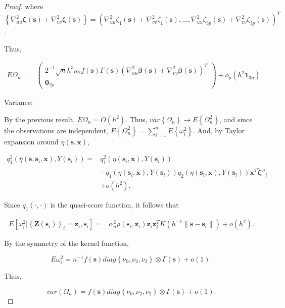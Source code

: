 \documentclass[english]{article}\usepackage[]{graphicx}\usepackage[]{color}
\theoremstyle{plain}
\theoremstyle{plain}
\begin{document}
\begin{proof}
where $\left\{ \nabla_{uu}^{2}\bm{\zeta}\left(\bm{s}\right)+\nabla_{vv}^{2}\bm{\zeta}\left(\bm{s}\right)\right\} =\left(\nabla_{uu}^{2}\zeta_{1}\left(\bm{s}\right)+\nabla_{vv}^{2}\zeta_{1}\left(\bm{s}\right),\dots,\nabla_{uu}^{2}\zeta_{3p}\left(\bm{s}\right)+\nabla_{vv}^{2}\zeta_{3p}\left(\bm{s}\right)\right)^{T}$.

Thus,

\begin{align*}
E\Omega_{n}= & \left(\begin{array}{c}
2^{-1}\sqrt{n}h^{3}\kappa_{2}f\left(\bm{s}\right)\Gamma\left(\bm{s}\right)\left(\nabla_{uu}^{2}\bm{\beta}\left(\bm{s}\right)+\nabla_{vv}^{2}\bm{\beta}\left(\bm{s}\right)\right)^{T}\\
\bm{0}_{2p}
\end{array}\right)+o_{p}\left(h^{2}\bm{1}_{3p}\right)
\end{align*}


Variance:

By the previous result, $E\Omega_{n}=O\left(h^{2}\right)$. Thus,
$var\left\{ \Omega_{n}\right\} \to E\left\{ \Omega_{n}^{2}\right\} $,
and since the observations are independent, $E\left\{ \Omega_{n}^{2}\right\} =\sum_{i=1}^{n}E\left\{ \omega_{i}^{2}\right\} $.
And, by Taylor expansion around $\eta\left(\bm{s},\bm{x}\right)$, 

\begin{align*}
q_{1}^{2}\left(\bar{\eta}\left(\bm{s},\bm{s}_{i},\bm{x}\right),Y\left(\bm{s}_{i}\right)\right)= & q_{1}^{2}\left(\eta\left(\bm{s}_{i},\bm{x}\right),Y\left(\bm{s}_{i}\right)\right)\\
 & -q_{1}\left(\eta\left(\bm{s}_{i},\bm{x}\right),Y\left(\bm{s}_{i}\right)\right)q_{2}\left(\eta\left(\bm{s}_{i},\bm{x}\right),Y\left(\bm{s}_{i}\right)\right)\bm{x}^{T}\tilde{\bm{\zeta}}''_{i}\\
 & +o\left(h^{2}\right).
\end{align*}


Since $q_{1}\left(\cdot,\cdot\right)$ is the quasi-score function,
it follows that 

\begin{align*}
E\left[\omega_{i}^{2}|\left\{ \bm{Z}\left(\bm{s}_{i}\right)\right\} _{i}=\bm{z}_{i},\bm{s}_{i}\right]= & \alpha_{n}^{2}\rho\left(\bm{s}_{i},\bm{z}_{i}\right)\bm{z}_{i}\bm{z}_{i}^{T}K\left(h^{-1}\|\bm{s}-\bm{s}_{i}\|\right)+o\left(h^{2}\right).
\end{align*}


By the symmetry of the kernel function,

\[
E\omega_{i}^{2}=n^{-1}f\left(\bm{s}\right)diag\left\{ \nu_{0},\nu_{2},\nu_{2}\right\} \otimes\Gamma\left(\bm{s}\right)+o\left(1\right).
\]


Thus, 

\[
var\left(\Omega_{n}\right)=f\left(\bm{s}\right)diag\left\{ \nu_{0},\nu_{2},\nu_{2}\right\} \otimes\Gamma\left(\bm{s}\right)+o\left(1\right).
\]

\end{proof}
\end{document}
